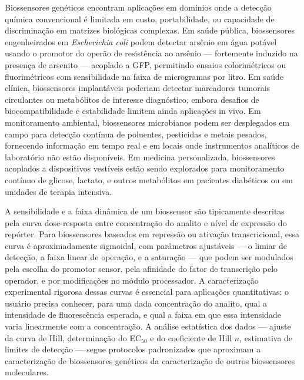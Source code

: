 Biossensores genéticos encontram aplicações em domínios onde a detecção química convencional é limitada em custo, portabilidade, ou capacidade de discriminação em matrizes biológicas complexas. Em saúde pública, biossensores engenheirados em \textit{Escherichia coli} podem detectar arsênio em água potável usando o promotor do operão de resistência ao arsênio --- fortemente induzido na presença de arsenito --- acoplado a GFP, permitindo ensaios colorimétricos ou fluorimétricos com sensibilidade na faixa de microgramas por litro. Em saúde clínica, biossensores implantáveis poderiam detectar marcadores tumorais circulantes ou metabólitos de interesse diagnóstico, embora desafios de biocompatibilidade e estabilidade limitem ainda aplicações in vivo. Em monitoramento ambiental, biossensores microbianos podem ser desplegados em campo para detecção contínua de poluentes, pesticidas e metais pesados, fornecendo informação em tempo real e em locais onde instrumentos analíticos de laboratório não estão disponíveis. Em medicina personalizada, biossensores acoplados a dispositivos vestíveis estão sendo explorados para monitoramento contínuo de glicose, lactato, e outros metabólitos em pacientes diabéticos ou em unidades de terapia intensiva.

A sensibilidade e a faixa dinâmica de um biossensor são tipicamente descritas pela curva dose-resposta entre concentração do analito e nível de expressão do repórter. Para biossensores baseados em repressão ou ativação transcricional, essa curva é aproximadamente sigmoidal, com parâmetros ajustáveis --- o limiar de detecção, a faixa linear de operação, e a saturação --- que podem ser modulados pela escolha do promotor sensor, pela afinidade do fator de transcrição pelo operador, e por modificações no módulo processador. A caracterização experimental rigorosa dessas curvas é essencial para aplicações quantitativas: o usuário precisa conhecer, para uma dada concentração do analito, qual a intensidade de fluorescência esperada, e qual a faixa em que essa intensidade varia linearmente com a concentração. A análise estatística dos dados --- ajuste da curva de Hill, determinação do EC$_{50}$ e do coeficiente de Hill $n$, estimativa de limites de detecção --- segue protocolos padronizados que aproximam a caracterização de biossensores genéticos da caracterização de outros biossensores moleculares.

